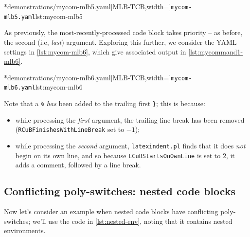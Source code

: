	\begin{cmhtcbraster}[raster column skip=.1\linewidth]
		\cmhlistingsfromfile[style=yaml-LST]*{demonstrations/mycom-mlb5.yaml}[MLB-TCB,width=\linewidth]{\texttt{mycom-mlb5.yaml}}{lst:mycom-mlb5}
	\end{cmhtcbraster}

	As previously, the most-recently-processed code block takes priority -- as before, the
	second (i.e, \emph{last}) argument. Exploring this further, we consider the YAML settings
	in \cref{lst:mycom-mlb6}, which give associated output in \cref{lst:mycommand1-mlb6}.

	\begin{cmhtcbraster}[raster column skip=.1\linewidth]
		\cmhlistingsfromfile[style=yaml-LST]*{demonstrations/mycom-mlb6.yaml}[MLB-TCB,width=\linewidth]{\texttt{mycom-mlb6.yaml}}{lst:mycom-mlb6}
	\end{cmhtcbraster}

	Note that a \lstinline!%! \emph{has} been added to the trailing first
	\lstinline!}!; this is because:
	\begin{itemize}
		\item while processing the \emph{first} argument, the trailing line break has been removed
		      (\texttt{RCuBFinishesWithLineBreak} set to $-1$);
		\item while processing the \emph{second} argument, \texttt{latexindent.pl} finds that it does
		      \emph{not} begin on its own line, and so because \texttt{LCuBStartsOnOwnLine} is set to
		      $2$, it adds a comment, followed by a line break.
	\end{itemize}

\subsection{Conflicting poly-switches: nested code blocks}
	Now let's consider an example when nested code blocks have conflicting poly-switches;
	we'll use the code in \cref{lst:nested-env}, noting that it contains nested environments.



